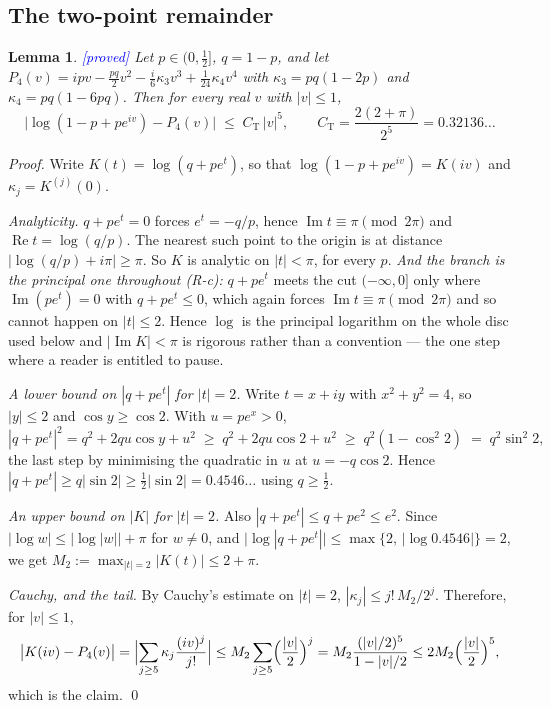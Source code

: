 \documentclass[11pt,a4paper]{article}
\theoremstyle{plain}
\newtheorem{lemma}[theorem]{Lemma}
\theoremstyle{definition}
\theoremstyle{remark}
\newcommand{\STATUS}[1]{\textcolor{blue}{\textsf{[#1]}}}
\begin{document}
\subsection{The two-point remainder}\label{app:taylor}

\begin{lemma}\label{lem:twopoint}
\STATUS{proved}
Let $p\in(0,\tfrac12]$, $q=1-p$, and let
$P_4(v)=ipv-\tfrac{pq}{2}v^{2}-\tfrac{i}{6}\kappa_3v^{3}+\tfrac{1}{24}\kappa_4v^{4}$ with
$\kappa_3=pq(1-2p)$ and $\kappa_4=pq(1-6pq)$. Then for every real $v$ with $|v|\le1$,
\[
  \bigl|\log(1-p+pe^{iv})-P_4(v)\bigr|\;\le\;C_{\mathrm{T}}\,|v|^{5},
  \qquad C_{\mathrm{T}}=\frac{2(2+\pi)}{2^{5}}=0.32136\ldots
\]
\end{lemma}

\begin{proof}
Write $K(t)=\log(q+pe^{t})$, so that $\log(1-p+pe^{iv})=K(iv)$ and $\kappa_j=K^{(j)}(0)$.

\emph{Analyticity.} $q+pe^{t}=0$ forces $e^{t}=-q/p$, hence $\operatorname{Im}t\equiv\pi
\pmod{2\pi}$ and $\operatorname{Re}t=\log(q/p)$. The nearest such point to the origin is at
distance $|\log(q/p)+i\pi|\ge\pi$. So $K$ is analytic on $|t|<\pi$, for every $p$.
\emph{And the branch is the principal one throughout (R-c):} $q+pe^{t}$ meets the cut
$(-\infty,0]$ only where $\operatorname{Im}(pe^{t})=0$ with $q+pe^{t}\le0$, which again forces
$\operatorname{Im}t\equiv\pi\pmod{2\pi}$ and so cannot happen on $|t|\le2$. Hence $\log$ is the
principal logarithm on the whole disc used below and $|\operatorname{Im}K|<\pi$ is rigorous
rather than a convention --- the one step where a reader is entitled to pause.

\emph{A lower bound on $|q+pe^{t}|$ for $|t|=2$.} Write $t=x+iy$ with $x^{2}+y^{2}=4$, so
$|y|\le2$ and $\cos y\ge\cos2$. With $u=pe^{x}>0$,
\[
  |q+pe^{t}|^{2}=q^{2}+2qu\cos y+u^{2}\;\ge\;q^{2}+2qu\cos2+u^{2}\;\ge\;q^{2}(1-\cos^{2}2)
  \;=\;q^{2}\sin^{2}2,
\]
the last step by minimising the quadratic in $u$ at $u=-q\cos2$. Hence
$|q+pe^{t}|\ge q|\sin2|\ge\tfrac12|\sin2|=0.4546\ldots$ using $q\ge\tfrac12$.

\emph{An upper bound on $|K|$ for $|t|=2$.} Also $|q+pe^{t}|\le q+pe^{2}\le e^{2}$. Since
$|\log w|\le\bigl|\log|w|\bigr|+\pi$ for $w\ne0$, and
$\bigl|\log|q+pe^{t}|\bigr|\le\max\{2,\,|\log0.4546|\}=2$, we get $M_2:=\max_{|t|=2}|K(t)|
\le2+\pi$.

\emph{Cauchy, and the tail.} By Cauchy's estimate on $|t|=2$, $|\kappa_j|\le j!\,M_2/2^{j}$.
Therefore, for $|v|\le1$,
\[
  \bigl|K(iv)-P_4(v)\bigr|=\Bigl|\sum_{j\ge5}\kappa_j\frac{(iv)^{j}}{j!}\Bigr|
  \le M_2\sum_{j\ge5}\Bigl(\frac{|v|}{2}\Bigr)^{j}
  = M_2\frac{(|v|/2)^{5}}{1-|v|/2}\le 2M_2\Bigl(\frac{|v|}{2}\Bigr)^{5},
\]
which is the claim. \qed
\end{proof}
\end{document}
